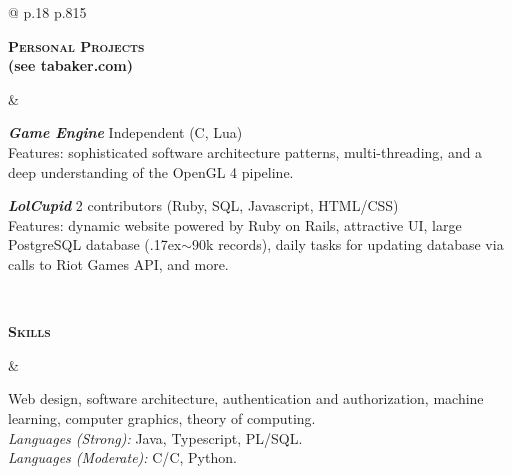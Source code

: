 \documentclass[10pt]{article}
\def\mytilde{{\raise.17ex\hbox{$\scriptstyle\mathtt{\sim}$}}}
\def\cpp{{C\nolinebreak[4]\hspace{-.05em}\raisebox{.4ex}{\tiny\bf ++}}}
\newcommand{\titlecell}[1]{%
  \begin{minipage}[t]{\linewidth}
    \raggedleft \textbf{#1}
\end{minipage}}
\newcommand{\contentcell}[1]{%
  \begin{minipage}[t]{\linewidth}
    #1
\end{minipage}}
\newcommand{\tablerowskip}{\vspace{4.83mm} \\}
\newcommand{\projectskip}{\vspace{3mm}}
\newcommand{\contentcellheader}[1]{\textbf{\textsl{#1}}}
\begin{document}
\begin{tabular}{@{} p{.18\textwidth} p{.815\textwidth}}
          \titlecell{\textsc{Personal Projects} \\ {\small (see tabaker.com)}} &
          \contentcell{
            \contentcellheader{Game Engine} \hfill Independent (\cpp, Lua)
            \\ Features: sophisticated software architecture patterns, multi-threading, and a deep understanding of the OpenGL 4
            pipeline.
            \projectskip

            \contentcellheader{LolCupid} \hfill 2 contributors (Ruby, SQL, Javascript, HTML/CSS)
            \\ Features: dynamic website powered by Ruby on Rails, attractive UI, large PostgreSQL database (\mytilde 90k records), daily tasks for updating database via calls to Riot Games API, and more.
          }
          \tablerowskip

          \titlecell{\textsc{Skills}} &
          \contentcell{
            Web design, software architecture, authentication and authorization, machine learning, computer graphics, theory of computing. \\
            {\sl Languages (Strong):} Java, Typescript, PL/SQL. \\
            {\sl Languages (Moderate):} C/\cpp, Python. \\
          }
        \end{tabular}
\end{document}
